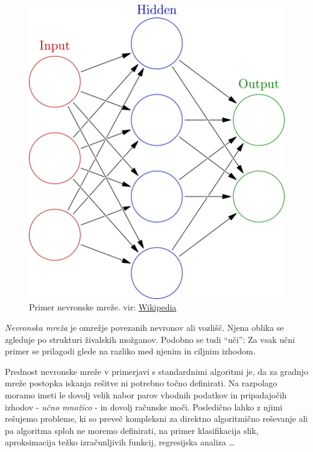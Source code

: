 \documentclass[a4paper,11pt]{article}
\begin{document}
\begin{figure}[htbp]
\begin{center}
\includegraphics[scale=0.25]{neural_network.png}
\caption{Primer nevronske mreže. vir:
	\href{https://en.wikipedia.org/wiki/Artificial\_neural\_network\#/media/File:Colored\_neural\_network.svg}{Wikipedia}}
\label{slika1}
\end{center}
\end{figure}
\emph{Nevronska mreža} je omrežje povezanih nevronov ali vozlišč.\cite{ann_def_1}
Njena oblika se zgleduje po strukturi živalskih možganov.\cite{ann_def_2}
Podobno se tudi ``uči'': Za vsak učni primer se prilagodi glede na razliko med njenim in ciljnim izhodom.

Prednost nevronske mreže v primerjavi s standardnimi algoritmi je, da za gradnjo mreže postopka iskanja rešitve ni potrebno točno definirati.
Na razpolago moramo imeti le dovolj velik nabor parov vhodnih podatkov in pripadajočih izhodov - \emph{učno množico} - in dovolj računske moči.
Posledično lahko z njimi rešujemo probleme, ki so preveč kompleksni za direktno algoritmično reševanje ali pa algoritma sploh ne moremo definirati,
	na primer klasifikacija slik, aproksimacija težko izračunljivih funkcij, regresijska analiza \ldots
\end{document}
